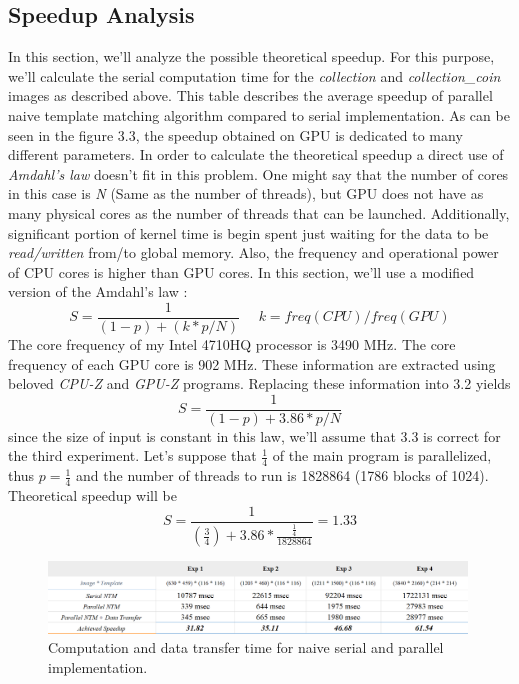 \subsection{Speedup Analysis}
In this section, we'll analyze the possible theoretical speedup. For this purpose, we'll calculate the serial computation time for the \textit{collection} and \textit{collection\_coin} images as described above. This table describes the average speedup of parallel naive template matching algorithm compared to serial implementation. As can be seen in the figure 3.3, the speedup obtained on GPU is dedicated to many different parameters. In order to calculate the theoretical speedup a direct use of \textit{Amdahl's law} doesn't fit in this problem. One might say that the number of cores in this case is \textit{N} (Same as the number of threads), but GPU does not have as many physical cores as the number of threads that can be launched. Additionally, significant portion of kernel time is begin spent just waiting for the data to be \textit{read/written} from/to global memory. Also, the frequency and operational power of CPU cores is higher than GPU cores. In this section, we'll use a modified version of the Amdahl's law \cite{amdahl}:
\begin{equation}
	S = \frac{1}{(1 - p) + (k * p / N)} \ \ \ \ \  \ k = freq(CPU) / freq(GPU)
\end{equation}
The core frequency of my Intel 4710HQ processor is 3490 MHz. The core frequency of each GPU core is 902 MHz. These information are extracted using beloved \textit{CPU-Z} and \textit{GPU-Z} programs. Replacing these information into 3.2 yields
\begin{equation}
	S = \frac{1}{(1 - p) + 3.86 * p / N}
\end{equation}
since the size of input is constant in this law, we'll assume that 3.3 is correct for the third experiment. Let's suppose that $\frac{1}{4}$ of the main program is parallelized, thus $p = \frac{1}{4}$ and the number of threads to run is 1828864 (1786 blocks of 1024). Theoretical speedup will be
\begin{equation}
	S = \frac{1}{(\frac{3}{4}) + 3.86 * \frac{\frac{1}{4}}{1828864}} = 1.33
\end{equation}
\begin{figure}[!h]\centering
	\includegraphics[width=0.99\textwidth]{speedup.PNG}
	\caption{Computation and data transfer time for naive serial and parallel implementation.}
	\label{pl1}
\end{figure}

